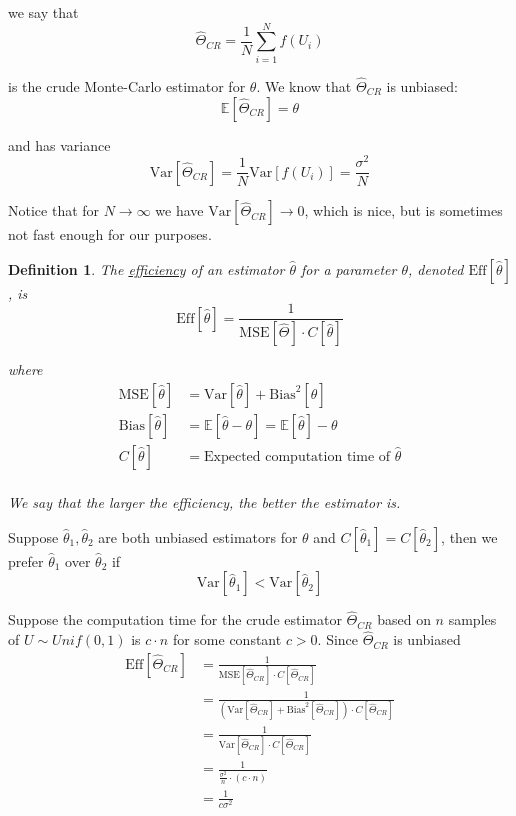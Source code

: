 \documentclass[12pt]{article}
\newtheorem{definition}{Definition}
\newlength\tindent
\renewcommand{\indent}{\hspace*{\tindent}}
\begin{document}
we say that
\begin{equation*}
	\hat{\Theta}_{CR} = \frac{1}{N}\sum^{N}_{i=1} f(U_i)
\end{equation*}

is the crude Monte-Carlo estimator for $\theta$. We know that $\hat{\Theta}_{CR}$ is unbiased:
\begin{equation*}
	\mathbb E[\hat{\Theta}_{CR}] = \theta
\end{equation*}

and has variance
\begin{equation*}
	\mathrm{Var}[\hat{\Theta}_{CR}] = \frac{1}{N}\mathrm{Var}[f(U_i)] = \frac{\sigma^2}{N}
\end{equation*}

\indent Notice that for $N\to\infty$ we have $\mathrm{Var}[\hat{\Theta}_{CR}] \to 0$, which is nice, but is sometimes not fast enough for our purposes.

\begin{definition} The \underline{efficiency} of an estimator $\hat{\theta}$ for a parameter $\theta$, denoted $\mathrm{Eff}[\hat{\theta}]$, is
\begin{equation*}
	\mathrm{Eff}[\hat{\theta}] = \frac{1}{\mathrm{MSE}[\hat{\Theta}] \cdot C[\hat{\theta}]}
\end{equation*}

where
\begin{align*}
	\mathrm{MSE}[\hat{\theta}] &= \mathrm{Var}[\hat{\theta}] + \mathrm{Bias}^2[\hat{\theta}] \\
	\mathrm{Bias}[\hat{\theta}] &= \mathbb E[\hat{\theta} - \theta] = \mathbb E[\hat{\theta}] - \theta \\
	C[\hat{\theta}] &= \text{Expected computation time of } \hat{\theta}\\
\end{align*}

We say that the larger the efficiency, the better the estimator is.
\end{definition}

\indent Suppose $\hat{\theta}_1, \hat{\theta}_2$ are both unbiased estimators for $\theta$ and $C[\hat{\theta}_1] = C[\hat{\theta}_2]$, then we prefer $\hat{\theta}_1$ over $\hat{\theta}_2$ if
\begin{equation*}
	\mathrm{Var}[\hat{\theta}_1] < \mathrm{Var}[\hat{\theta}_2]
\end{equation*}

\indent Suppose the computation time for the crude estimator $\hat{\Theta}_{CR}$ based on $n$ samples of $U\sim Unif(0,1)$ is $c\cdot n$ for some constant $c > 0$. Since $\hat{\Theta}_{CR}$ is unbiased
\begin{align*}
	\mathrm{Eff}[\hat{\Theta}_{CR}] &= \frac{1}{\mathrm{MSE}[\hat{\Theta}_{CR}] \cdot C[\hat{\Theta}_{CR}]} \\
	&= \frac{1}{(\mathrm{Var}[\hat{\Theta}_{CR}] + \mathrm{Bias}^2[\hat{\Theta}_{CR}])\cdot C[\hat{\Theta}_{CR}]} \\
	&= \frac{1}{\mathrm{Var}[\hat{\Theta}_{CR}]\cdot C[\hat{\Theta}_{CR}]} \\  
	&= \frac{1}{\frac{\sigma^2}{n}\cdot (c\cdot n)} \\
	&= \frac{1}{c\sigma^2}
\end{align*}
\end{document}
